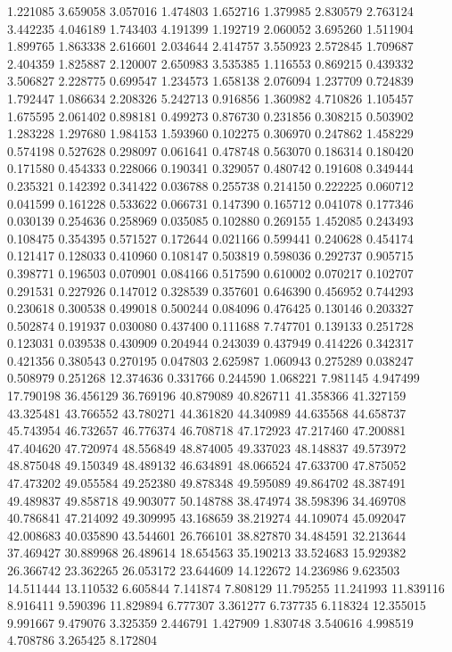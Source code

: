 1.221085
3.659058
3.057016
1.474803
1.652716
1.379985
2.830579
2.763124
3.442235
4.046189
1.743403
4.191399
1.192719
2.060052
3.695260
1.511904
1.899765
1.863338
2.616601
2.034644
2.414757
3.550923
2.572845
1.709687
2.404359
1.825887
2.120007
2.650983
3.535385
1.116553
0.869215
0.439332
3.506827
2.228775
0.699547
1.234573
1.658138
2.076094
1.237709
0.724839
1.792447
1.086634
2.208326
5.242713
0.916856
1.360982
4.710826
1.105457
1.675595
2.061402
0.898181
0.499273
0.876730
0.231856
0.308215
0.503902
1.283228
1.297680
1.984153
1.593960
0.102275
0.306970
0.247862
1.458229
0.574198
0.527628
0.298097
0.061641
0.478748
0.563070
0.186314
0.180420
0.171580
0.454333
0.228066
0.190341
0.329057
0.480742
0.191608
0.349444
0.235321
0.142392
0.341422
0.036788
0.255738
0.214150
0.222225
0.060712
0.041599
0.161228
0.533622
0.066731
0.147390
0.165712
0.041078
0.177346
0.030139
0.254636
0.258969
0.035085
0.102880
0.269155
1.452085
0.243493
0.108475
0.354395
0.571527
0.172644
0.021166
0.599441
0.240628
0.454174
0.121417
0.128033
0.410960
0.108147
0.503819
0.598036
0.292737
0.905715
0.398771
0.196503
0.070901
0.084166
0.517590
0.610002
0.070217
0.102707
0.291531
0.227926
0.147012
0.328539
0.357601
0.646390
0.456952
0.744293
0.230618
0.300538
0.499018
0.500244
0.084096
0.476425
0.130146
0.203327
0.502874
0.191937
0.030080
0.437400
0.111688
7.747701
0.139133
0.251728
0.123031
0.039538
0.430909
0.204944
0.243039
0.437949
0.414226
0.342317
0.421356
0.380543
0.270195
0.047803
2.625987
1.060943
0.275289
0.038247
0.508979
0.251268
12.374636
0.331766
0.244590
1.068221
7.981145
4.947499
17.790198
36.456129
36.769196
40.879089
40.826711
41.358366
41.327159
43.325481
43.766552
43.780271
44.361820
44.340989
44.635568
44.658737
45.743954
46.732657
46.776374
46.708718
47.172923
47.217460
47.200881
47.404620
47.720974
48.556849
48.874005
49.337023
48.148837
49.573972
48.875048
49.150349
48.489132
46.634891
48.066524
47.633700
47.875052
47.473202
49.055584
49.252380
49.878348
49.595089
49.864702
48.387491
49.489837
49.858718
49.903077
50.148788
38.474974
38.598396
34.469708
40.786841
47.214092
49.309995
43.168659
38.219274
44.109074
45.092047
42.008683
40.035890
43.544601
26.766101
38.827870
34.484591
32.213644
37.469427
30.889968
26.489614
18.654563
35.190213
33.524683
15.929382
26.366742
23.362265
26.053172
23.644609
14.122672
14.236986
9.623503
14.511444
13.110532
6.605844
7.141874
7.808129
11.795255
11.241993
11.839116
8.916411
9.590396
11.829894
6.777307
3.361277
6.737735
6.118324
12.355015
9.991667
9.479076
3.325359
2.446791
1.427909
1.830748
3.540616
4.998519
4.708786
3.265425
8.172804
